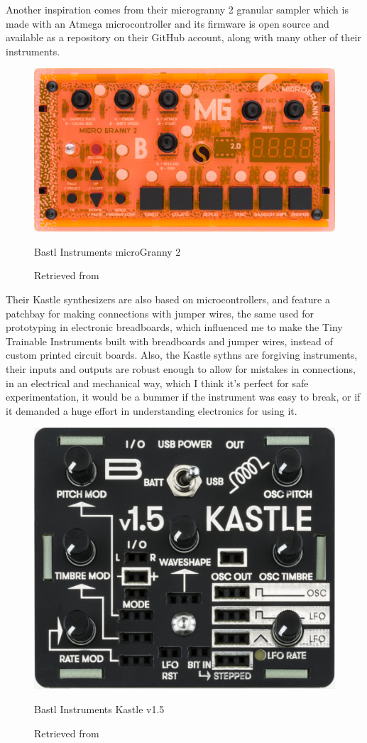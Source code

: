 Another inspiration comes from their microgranny 2 granular sampler which is made with an Atmega microcontroller and its firmware is open source and available as a repository on their GitHub account, along with many other of their instruments.

\begin{figure}[ht]
  \centering
  \includegraphics[width=0.75\linewidth,height=0.25\textheight,keepaspectratio]{images/bastl-microgranny-2.jpg}
  \caption{Bastl Instruments microGranny 2}
  \caption*{Retrieved from \cite{website-bastl-instruments-current}}
  \label{fig:bastl-microgranny-2}
\end{figure}

Their Kastle synthesizers are also based on microcontrollers, and feature a patchbay for making connections with jumper wires, the same used for prototyping in electronic breadboards, which influenced me to make the Tiny Trainable Instruments built with breadboards and jumper wires, instead of custom printed circuit boards. Also, the Kastle sythns are forgiving instruments, their inputs and outputs are robust enough to allow for mistakes in connections, in an electrical and mechanical way, which I think it's perfect for safe experimentation, it would be a bummer if the instrument was easy to break, or if it demanded a huge effort in understanding electronics for using it.

\begin{figure}[ht]
  \centering
  \includegraphics[width=0.75\linewidth,height=0.25\textheight,keepaspectratio]{images/bastl-kastle-v15.jpg}
  \caption{Bastl Instruments Kastle v1.5}
  \caption*{Retrieved from \cite{website-bastl-instruments-current}}
  \label{fig:bastl-kastle-v15}
\end{figure}


